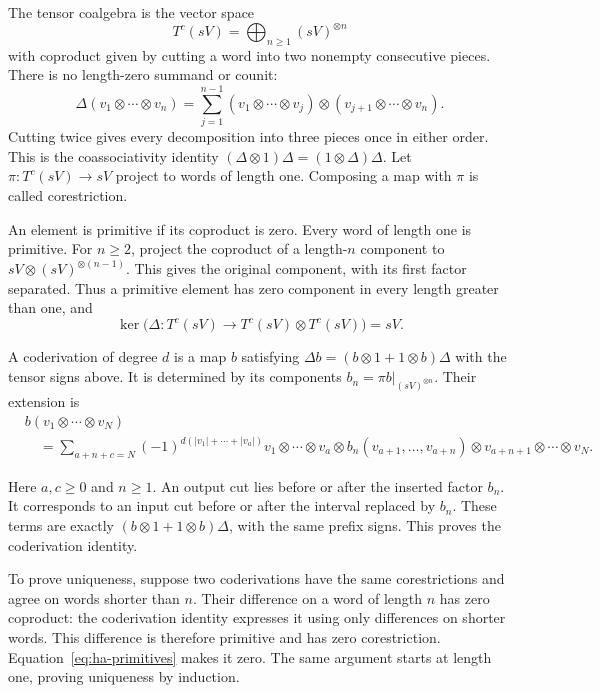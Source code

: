 The tensor coalgebra is the vector space
\[
 T^c(sV)=\bigoplus_{n\geq1}(sV)^{\otimes n}
\]
with coproduct given by cutting a word into two nonempty consecutive
pieces. There is no length-zero summand or counit:
\[
 \Delta(v_1\otimes\cdots\otimes v_n)
 =\sum_{j=1}^{n-1}(v_1\otimes\cdots\otimes v_j)
        \otimes(v_{j+1}\otimes\cdots\otimes v_n).
\]
Cutting twice gives every decomposition into three pieces once in
either order. This is the coassociativity identity
$(\Delta\otimes1)\Delta=(1\otimes\Delta)\Delta$.
Let $\pi:T^c(sV)\to sV$ project to words of length one.
Composing a map with $\pi$ is called corestriction.

An element is primitive if its coproduct is zero.
Every word of length one is primitive.
For $n\geq2$, project the coproduct of a length-$n$ component
to $sV\otimes(sV)^{\otimes(n-1)}$.
This gives the original component, with its first factor separated.
Thus a primitive element has zero component in every length greater
than one, and
\begin{equation}\label{eq:ha-primitives}
 \ker\bigl(\Delta:T^c(sV)\to T^c(sV)\otimes T^c(sV)\bigr)=sV.
\end{equation}

A coderivation of degree $d$ is a map $b$ satisfying
$\Delta b=(b\otimes1+1\otimes b)\Delta$ with the tensor signs above.
It is determined by its components $b_n=\pi b|_{(sV)^{\otimes n}}$.
Their extension is
\begin{equation}\label{eq:ha-coderivation-extension}
 \begin{split}
 &b(v_1\otimes\cdots\otimes v_N)\\
 &\quad=\sum_{a+n+c=N}(-1)^{d(|v_1|+\cdots+|v_a|)}
 v_1\otimes\cdots\otimes v_a\otimes
 b_n(v_{a+1},\ldots,v_{a+n})\otimes
 v_{a+n+1}\otimes\cdots\otimes v_N .
 \end{split}
\end{equation}

Here $a,c\geq0$ and $n\geq1$.
An output cut lies before or after the inserted factor $b_n$.
It corresponds to an input cut before or after the interval replaced
by $b_n$. These terms are exactly
$(b\otimes1+1\otimes b)\Delta$, with the same prefix signs.
This proves the coderivation identity.

To prove uniqueness, suppose two coderivations have the same
corestrictions and agree on words shorter than $n$.
Their difference on a word of length $n$ has zero coproduct:
the coderivation identity expresses it using only differences on
shorter words. This difference is therefore primitive and has zero
corestriction. Equation~\eqref{eq:ha-primitives} makes it zero.
The same argument starts at length one, proving uniqueness by induction.

